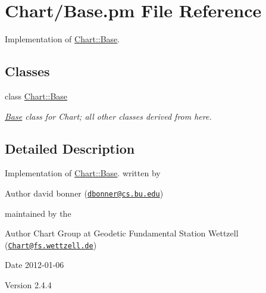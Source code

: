 \hypertarget{Base_8pm}{
\section{Chart/Base.pm File Reference}
\label{Base_8pm}
}


Implementation of \hyperlink{classChart_1_1Base}{Chart::Base}.  


\subsection*{Classes}
\begin{DoxyCompactItemize}
\item 
class \hyperlink{classChart_1_1Base}{Chart::Base}
\begin{DoxyCompactList}\small\item\em \hyperlink{classChart_1_1Base}{Base} class for Chart; all other classes derived from here. \item\end{DoxyCompactList}\end{DoxyCompactItemize}


\subsection{Detailed Description}
Implementation of \hyperlink{classChart_1_1Base}{Chart::Base}. written by \begin{DoxyAuthor}{Author}
david bonner (\href{mailto:dbonner@cs.bu.edu}{\tt dbonner@cs.bu.edu})
\end{DoxyAuthor}
maintained by the \begin{DoxyAuthor}{Author}
Chart Group at Geodetic Fundamental Station Wettzell (\href{mailto:Chart@fs.wettzell.de}{\tt Chart@fs.wettzell.de}) 
\end{DoxyAuthor}
\begin{DoxyDate}{Date}
2012-\/01-\/06 
\end{DoxyDate}
\begin{DoxyVersion}{Version}
2.4.4 
\end{DoxyVersion}

